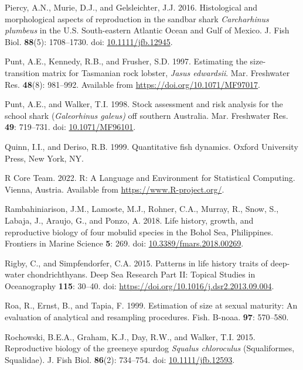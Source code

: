 \documentclass[
]{article}
\newenvironment{CSLReferences}%
  {}%
  {\par}
\begin{document}
\begin{CSLReferences}{1}{0}
Piercy, A.N., Murie, D.J., and Gelsleichter, J.J. 2016. Histological and morphological aspects of reproduction in the sandbar shark \emph{{Carcharhinus} plumbeus} in the {U}.{S}. South-eastern {Atlantic} {Ocean} and {Gulf} of {Mexico}. J. Fish Biol. \textbf{88}(5): 1708--1730. doi: \href{https://doi.org/10.1111/jfb.12945}{10.1111/jfb.12945}.

Punt, A.E., Kennedy, R.B., and Frusher, S.D. 1997. Estimating the size-transition matrix for {Tasmanian} rock lobster, \emph{{Jasus} edwardsii}. Mar. Freshwater Res. \textbf{48}(8): 981--992. Available from \url{https://doi.org/10.1071/MF97017}.

Punt, A.E., and Walker, T.I. 1998. Stock assessment and risk analysis for the school shark (\emph{{Galeorhinus} galeus)} off southern {Australia}. Mar. Freshwater Res. \textbf{49}: 719--731. doi: \href{https://doi.org/10.1071/MF96101}{10.1071/MF96101}.

Quinn, I.I., and Deriso, R.B. 1999. Quantitative fish dynamics. Oxford University Press, New York, NY.

R Core Team. 2022. R: {A} {Language} and {Environment} for {Statistical} {Computing}. Vienna, Austria. Available from \url{https://www.R-project.org/}.

Rambahiniarison, J.M., Lamoste, M.J., Rohner, C.A., Murray, R., Snow, S., Labaja, J., Araujo, G., and Ponzo, A. 2018. Life history, growth, and reproductive biology of four mobulid species in the {Bohol} {Sea}, {Philippines}. Frontiers in Marine Science \textbf{5}: 269. doi: \href{https://doi.org/10.3389/fmars.2018.00269}{10.3389/fmars.2018.00269}.

Rigby, C., and Simpfendorfer, C.A. 2015. Patterns in life history traits of deep-water chondrichthyans. Deep Sea Research Part II: Topical Studies in Oceanography \textbf{115}: 30--40. doi: \url{https://doi.org/10.1016/j.dsr2.2013.09.004}.

Roa, R., Ernst, B., and Tapia, F. 1999. Estimation of size at sexual maturity: An evaluation of analytical and resampling procedures. Fish. B-noaa. \textbf{97}: 570--580.

Rochowski, B.E.A., Graham, K.J., Day, R.W., and Walker, T.I. 2015. Reproductive biology of the greeneye spurdog \emph{{Squalus} chloroculus} ({Squaliformes}, {Squalidae}). J. Fish Biol. \textbf{86}(2): 734--754. doi: \href{https://doi.org/10.1111/jfb.12593}{10.1111/jfb.12593}.


\end{CSLReferences}
\end{document}
